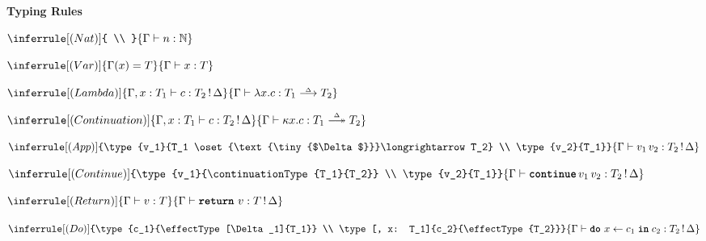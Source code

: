 \begin{figure}
  \begin{eff-desc}
    {\large\textbf{Typing Rules}}\\
    
    {
    \centering 
    \begin{minipage}[t]{0.2\textwidth}
      \centering
      $\inferrule[(Nat)]
      { \\ }
      {\type{n}{\mathbb{N}}}$
      \end{minipage}%
  \begin{minipage}[t]{0.2\textwidth}
    \centering
  $\inferrule[(Var)]
  {\Gamma(x) = T}
  {\type{x}{T}}$
  \end{minipage}%
  \begin{minipage}[t]{0.3\textwidth}
    \centering
  $\inferrule[(Lambda)]
    {\type[, x:T_1]{c}{\effectType{T_2}}}
    {\type{\function{x}{c}}{\functionType{T_1}{T_2}}}$
  \end{minipage}%
  \begin{minipage}[t]{0.3\textwidth}
  \centering
$\inferrule[(Continuation)]
  {\type[, x:T_1]{c}{\effectType{T_2}}}
  {\type{\continuation{x}{c}}{\continuationType{T_1}{T_2}}}$
\end{minipage}
  
  \vspace{5mm}
  
  \begin{minipage}[t]{0.5\textwidth}
    \centering
  $\inferrule[(App)]
    {\type{v_1}{T_1 \oset{\text{\tiny{$\Delta$}}}\longrightarrow T_2} \\ \type{v_2}{T_1}}
    {\type{v_1 \, v_2}{\effectType{T_2}}}$
  \end{minipage}%
  \begin{minipage}[t]{0.5\textwidth}
    \centering
  $\inferrule[(Continue)]
    {\type{v_1}{\continuationType{T_1}{T_2}} \\ \type{v_2}{T_1}}
    {\type{\continue{v_1}{v_2}}{\effectType{T_2}}}$
  \end{minipage}

  \vspace{5mm}

  \begin{minipage}[t]{0.3\textwidth}
    \centering
  $\inferrule[(Return)]
    {\type{v}{T}}
    {\type{\return{v}}{\effectType{T}}}$
  \end{minipage}%
  \begin{minipage}[t]{0.55\textwidth}
    \centering
  $\inferrule[(Do)]
    {\type{c_1}{\effectType[\Delta_1]{T_1}} \\ \type[, x: T_1]{c_2}{\effectType{T_2}}}
    {\type{\bind{x}{c_1}{c_2}}{\effectType{T_2}}}$
  \end{minipage}
  
}
\end{eff-desc}
\end{figure}
